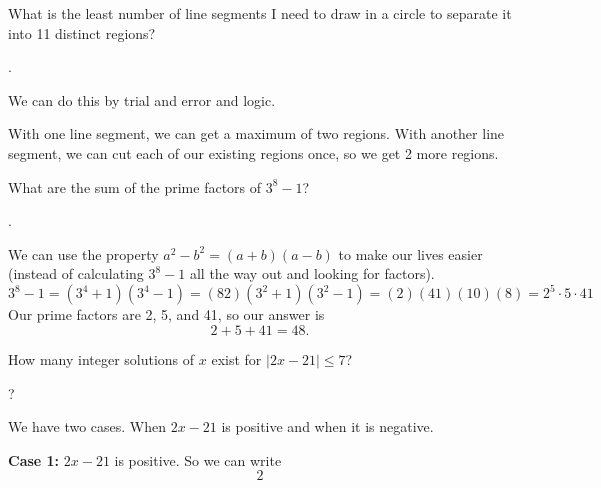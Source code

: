 \documentclass[11pt]{article}
\begin{document}

\begin{problem}
What is the least number of line segments I need to draw in a circle to separate it into 11 distinct regions?
\end{problem}
\begin{answer}
.
\end{answer}
\begin{solution}
We can do this by trial and error and logic. \par
With one line segment, we can get a maximum of two regions. With another line segment, we can cut each of our existing regions once, so we get 2 more regions.
\end{solution}

\begin{problem}
What are the sum of the prime factors of $3^{8}-1$?
\end{problem}
\begin{answer}
.
\end{answer}
\begin{solution}
We can use the property $a^2-b^2 = (a+b)(a-b)$ to make our lives easier (instead of calculating $3^8-1$ all the way out and looking for factors).
$$3^8-1 = (3^4+1)(3^4-1) = (82)(3^2+1)(3^2-1)=(2)(41)(10)(8)=2^5 \cdot 5 \cdot 41$$
Our prime factors are 2, 5, and 41, so our answer is
$$2+5+41 = \boxed{48}.$$
\end{solution}

\begin{problem}
How many integer solutions of $x$ exist for $\left|2x-21 \right| \leq 7$?
\end{problem}
\begin{answer} ?
\end{answer}
\begin{solution}
We have two cases. When $2x-21$ is positive and when it is negative. \par
\textbf{Case 1:} $2x-21$ is positive.
So we can write
$$2$$
\end{solution}

\begin{problem}
\end{problem}
\begin{answer}
\end{answer}
\begin{solution}
\end{solution}


\end{document}

